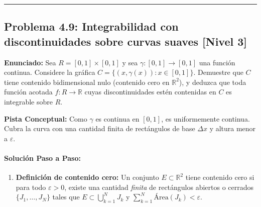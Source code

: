 \documentclass[11pt,a4paper]{article}
\begin{document}
\vspace{0.5cm}
\hrule
\vspace{0.5cm}

\subsection*{Problema 4.9: Integrabilidad con discontinuidades sobre curvas suaves \hfill \color{primaryblue}\small[Nivel 3]}

\begin{tcolorbox}[colback=white,colframe=gray!40,arc=1mm,boxrule=0.5pt,left=3mm,right=3mm,top=2mm,bottom=2mm]
\textbf{Enunciado:} Sea $R = [0,1] \times [0,1]$ y sea $\gamma: [0,1] \to [0,1]$ una función continua. Considere la gráfica $C = \{(x, \gamma(x)) : x \in [0,1]\}$. Demuestre que $C$ tiene contenido bidimensional nulo (contenido cero en $\mathbb{R}^2$), y deduzca que toda función acotada $f: R \to \mathbb{R}$ cuyas discontinuidades estén contenidas en $C$ es integrable sobre $R$.
\end{tcolorbox}

\begin{tcolorbox}[colback=yellow!4,colframe=accentamber!70,arc=1mm,boxrule=0.5pt,left=3mm,right=3mm,top=1.5mm,bottom=1.5mm]
\textbf{Pista Conceptual:} Como $\gamma$ es continua en $[0,1]$, es uniformemente continua. Cubra la curva con una cantidad finita de rectángulos de base $\Delta x$ y altura menor a $\varepsilon$.
\end{tcolorbox}

\paragraph{Solución Paso a Paso:}\par
\begin{enumerate}[label=\textbf{\arabic*.}]
\item \textbf{Definición de contenido cero:}
Un conjunto $E \subset \mathbb{R}^2$ tiene contenido cero si para todo $\varepsilon > 0$, existe una cantidad \textit{finita} de rectángulos abiertos o cerrados $\{J_1, \dots, J_N\}$ tales que $E \subset \bigcup_{k=1}^N J_k$ y $\sum_{k=1}^N \text{Área}(J_k) < \varepsilon$.
\end{enumerate}
\end{document}
